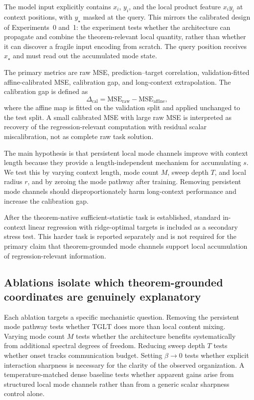 \documentclass[11pt]{article}
\theoremstyle{definition}
\newcommand{\TGLT}{\ensuremath{\mathrm{TGLT}}}
\begin{document}
The model input explicitly contains \(x_i\), \(y_i\), and the local product feature \(x_i y_i\) at context positions, with \(y_\star\) masked at the query. This mirrors the calibrated design of Experiments~0 and~1: the experiment tests whether the architecture can propagate and combine the theorem-relevant local quantity, rather than whether it can discover a fragile input encoding from scratch. The query position receives \(x_\star\) and must read out the accumulated mode state.

The primary metrics are raw MSE, prediction--target correlation, validation-fitted affine-calibrated MSE, calibration gap, and long-context extrapolation. The calibration gap is defined as
\begin{equation}
\Delta_{\mathrm{cal}}
=
\mathrm{MSE}_{\mathrm{raw}}
-
\mathrm{MSE}_{\mathrm{affine}},
\label{eq:calibration-gap}
\end{equation}
where the affine map is fitted on the validation split and applied unchanged to the test split. A small calibrated MSE with large raw MSE is interpreted as recovery of the regression-relevant computation with residual scalar miscalibration, not as complete raw task solution.

The main hypothesis is that persistent local mode channels improve with context length because they provide a length-independent mechanism for accumulating \(s\). We test this by varying context length, mode count \(M\), sweep depth \(T\), and local radius \(r\), and by zeroing the mode pathway after training. Removing persistent mode channels should disproportionately harm long-context performance and increase the calibration gap.

After the theorem-native sufficient-statistic task is established, standard in-context linear regression with ridge-optimal targets is included as a secondary stress test. This harder task is reported separately and is not required for the primary claim that theorem-grounded mode channels support local accumulation of regression-relevant information.


\subsection*{Ablations isolate which theorem-grounded coordinates are genuinely explanatory}

Each ablation targets a specific mechanistic question. Removing the persistent mode pathway tests whether \TGLT{} does more than local content mixing. Varying mode count \(M\) tests whether the architecture benefits systematically from additional spectral degrees of freedom. Reducing sweep depth \(T\) tests whether onset tracks communication budget. Setting \(\beta\to 0\) tests whether explicit interaction sharpness is necessary for the clarity of the observed organization. A temperature-matched dense baseline tests whether apparent gains arise from structured local mode channels rather than from a generic scalar sharpness control alone.
\end{document}
